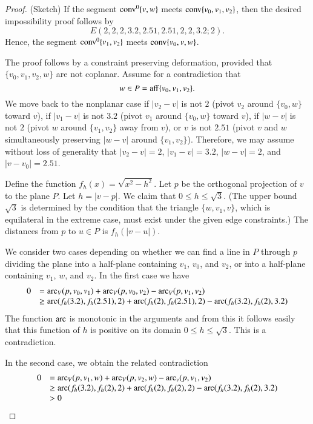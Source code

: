 \begin{tarskidata}
\begin{tarski}
\begin{proof} (Sketch)
If the segment ${\operatorname{conv}}^0\{v,w\}$ meets ${\operatorname{conv}}\{v_0,v_1,v_2\}$,
then the desired impossibility proof follows by
   $$
   E(2,2,2,  3.2,2.51,2.51,  2,2, 3.2; 2).
   $$
Hence, the segment ${\operatorname{conv}}^0\{v_1,v_2\}$ 
meets ${\operatorname{conv}}\{v_0,v,w\}$.

The proof
follows by a constraint preserving deformation, 
provided that $\{v_0,v_1,v_2,w\}$
are not coplanar. Assume for a contradiction that 
   $$
   w\in P={\operatorname{aff}}\{v_0,v_1,v_2\}.
   $$ 
We move back to the nonplanar case if
$|v_2-v|$ is not $2$ (pivot $v_2$ around $\{v_0,w\}$ toward $v$), if
$|v_1-v|$ is not $3.2$ (pivot $v_1$ around $\{v_0,w\}$ toward $v$), if
$|w-v|$ is not $2$ (pivot $w$ around $\{v_1,v_2\}$ away from $v$),
or $v$ is not $2.51$ (pivot $v$ and $w$ simultaneously preserving
$|w-v|$ around $\{v_1,v_2\}$).  Therefore, we may assume without
loss of generality that $|v_2-v|=2$, $|v_1-v|=3.2$, $|w-v|=2$, and
$|v-v_0|=2.51$.

Define the function $f_h(x)=\sqrt{x^2-h^2}$.
Let $p$ be the orthogonal projection of $v$ to the plane $P$.  Let
$h=|v-p|$. We claim that $0\le h \le\sqrt3$.
(The upper bound
$\sqrt3$ is determined by the condition that the triangle
$\{w,v_1,v\}$, which is equilateral in the extreme case, must exist under
the given edge constraints.)
The distances from $p$ to $u\in P$ is
$f_h(|v-u|)$. 

We consider two cases depending
on whether we can find a line in $P$ through $p$ dividing the
plane into a half-plane containing $v_1$, $v_0$, and $v_2$, or into
a half-plane containing $v_1$, $w$, and $v_2$.  In the first case
we have
 $$
\begin{array}{lll}
    0&=\operatorname{arc}_V(p,v_0,v_1)+
    \operatorname{arc}_V(p,v_0,v_2)- \operatorname{arc}_V(p,v_1,v_2)\\
    &\ge \operatorname{arc}(f_h(3.2),f_h(2.51),2)+
    \operatorname{arc}(f_h(2),f_h(2.51),2)-\operatorname{arc}(f_h(3.2),f_h(2),3.2)
\end{array}
 $$
The function $\operatorname{arc}$ is monotonic in the arguments and from this it
follows easily that this function of $h$ is positive on its domain
$0\le h\le \sqrt3$. This is a contradiction.  

In the second case, we obtain the
related contradiction
  $$
\begin{array}{lll}
    0&=\operatorname{arc}_V(p,v_1,w)+
    \operatorname{arc}_V(p,v_2,w)-
    \operatorname{arc}_v(p,v_1,v_2)\\
    &\ge \operatorname{arc}(f_h(3.2),f_h(2),2)+
    \operatorname{arc}(f_h(2),f_h(2),2)-\operatorname{arc}(f_h(3.2),f_h(2),3.2)\\
    &>0
\end{array}
  $$
\end{proof}
\end{tarski}






\end{tarskidata}
